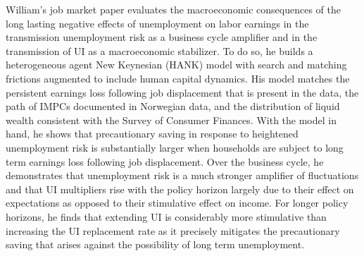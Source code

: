 \documentclass[\econtexRoot/Letter]{subfiles}
\begin{document}
\notinsubfile{\renewcommand{\econtexRoot}{.}}



William's job market paper evaluates the macroeconomic consequences of the long lasting negative effects of unemployment on labor earnings in the transmission unemployment risk as a business cycle amplifier and in the transmission of UI as a macroeconomic stabilizer. To do so, he builds a heterogeneous agent New Keynesian (HANK) model with search and matching frictions augmented to include human capital dynamics. His model matches the persistent earnings loss following job displacement that is present in the data, the path of IMPCs documented in Norwegian data, and the distribution of liquid wealth consistent with the Survey of Consumer Finances. With the model in hand, he shows that precautionary saving in response to heightened unemployment risk is substantially larger when households are subject to long term earnings loss following job displacement. Over the business cycle, he demonstrates that unemployment risk is a much stronger amplifier of fluctuations and that UI multipliers rise with the policy horizon largely due to their effect on expectations as opposed to their stimulative effect on income. For longer policy horizons, he finds that extending UI is considerably more stimulative than increasing the UI replacement rate as it precisely mitigates the precautionary saving that arises against the possibility of long term unemployment. 



\end{document}
